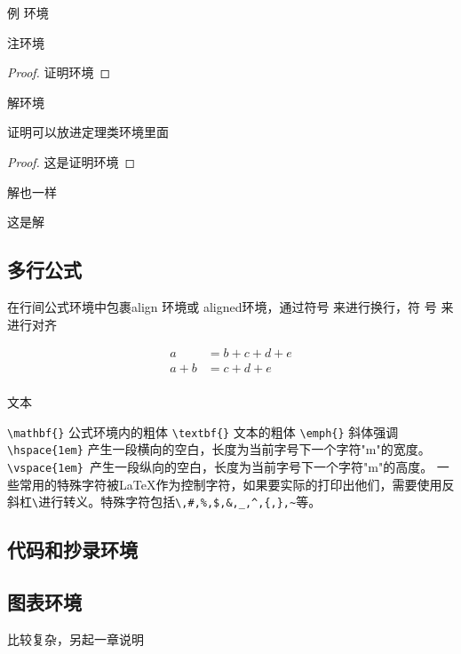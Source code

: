 \documentclass[../../main.tex]{subfiles}
\begin{document}
\begin{example}
例 环境
\end{example}




\begin{remark}
  注环境
\end{remark}





\begin{proof}
证明环境
\end{proof}


\begin{solution}
解环境
\end{solution}



\begin{theorem}

  证明可以放进定理类环境里面
\begin{proof}
这是证明环境
\end{proof}
\end{theorem}

\begin{example}
解也一样

\begin{solution}
这是解
\end{solution}

\end{example}


\subsection{多行公式}
在行间公式环境中包裹align 环境或 aligned环境，通过符号 来进行换行，符
号 来进行对齐

\begin{equation}
  \label{}
\begin{aligned}
  a&=b+c+d+e \\
  a+b&=c+d+e \\
\end{aligned}
\end{equation}




文本


\verb|\mathbf{}| 公式环境内的粗体
\verb|\textbf{}| 文本的粗体
\verb|\emph{}| 斜体强调
\verb|\hspace{1em}| 产生一段横向的空白，长度为当前字号下一个字符"m"的宽度。
\verb|\vspace{1em} |产生一段纵向的空白，长度为当前字号下一个字符"m"的高度。
一些常用的特殊字符被LaTeX作为控制字符，如果要实际的打印出他们，需要使用反斜杠\verb|\|进行转义。特殊字符包括\verb|\,#,%,$,&,_,^,{,},~|等。


\subsection{代码和抄录环境}



\subsection{图表环境}
比较复杂，另起一章说明
\end{document}

